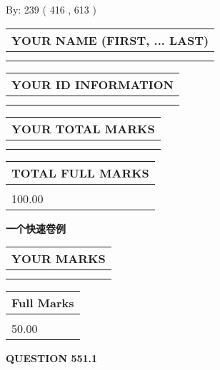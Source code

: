 \documentclass{ctexart}
\begin{document}
   
\hspace{1.0in} By: 
 239 ( 416 ,  613 )
   
   
   
   
\newpage 
\setcounter{page}{ 
   551001 } 
   
   
   
   
\noindent\begin{tabular}{|l|}
\hline
YOUR NAME (FIRST, ... LAST)  \\
\hline
 \\ 
 \\ 
\hline
\end{tabular}
\hspace{0.05in} \begin{tabular}{|l|}
\hline
 YOUR   ID   INFORMATION  \\
\hline
 \\ 
 \\ 
\hline
\end{tabular}
   
   
\vspace{0.2in}\noindent\begin{tabular}{|l|}
\hline
YOUR TOTAL MARKS  \\
\hline
 \\ 
 \\ 
\hline
\end{tabular}
\hspace{0.05in} \begin{tabular}{|l|}
\hline
TOTAL FULL MARKS  \\
\hline
 \\ 
100.00 \\
\hline
\end{tabular}
   
   
 \vspace{0.2in}
{\LARGE {\textbf{ 一个快速卷例}}}
   
   
  
\vspace{0.2in}
  
\noindent\begin{tabular}{|l|}
\hline
 YOUR MARKS  \\
\hline
 \\ 
 \\ 
\hline
\end{tabular}
\hspace{0.05in} \begin{tabular}{|l|}
\hline
 Full Marks  \\
\hline
 \\ 
50.00 \\
\hline
\end{tabular}
{\textbf{\Large{QUESTION
551.1 
}}}
  
\end{document}
